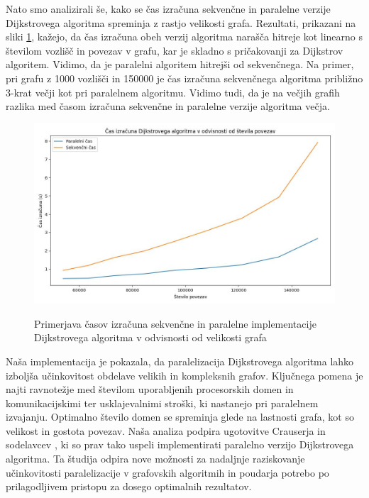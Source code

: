 \documentclass[mat1, tisk]{fmfdelo}
\begin{document}
Nato smo analizirali še, kako se čas izračuna sekvenčne in paralelne verzije Dijkstrovega algoritma spreminja z rastjo
velikosti grafa. Rezultati, prikazani na sliki \ref{fig:dijkstra_calculation_time_by_graph_size}, kažejo, da čas izračuna
obeh verzij algoritma narašča hitreje kot linearno s številom vozlišč in povezav v grafu, kar je skladno s pričakovanji
za Dijkstrov algoritem. Vidimo, da je paralelni algoritem hitrejši od sekvenčnega. Na primer, pri grafu z 1000 vozlišči
in 150000 je čas izračuna sekvenčnega algoritma približno 3-krat večji kot pri paralelnem algoritmu. Vidimo tudi, da je
na večjih grafih razlika med časom izračuna sekvenčne in paralelne verzije algoritma večja.  

\begin{figure}[h!]
  \centering
  \caption{Primerjava časov izračuna sekvenčne in paralelne implementacije Dijkstrovega algoritma v odvisnosti od velikosti grafa}
  \includegraphics[width=15cm]{slike/dijkstra_v_odvisnosti_od_velikosti_grafa.jpg}
  \label{fig:dijkstra_calculation_time_by_graph_size}
\end{figure}

Naša implementacija je pokazala, da paralelizacija Dijkstrovega algoritma lahko izboljša učinkovitost obdelave velikih
in kompleksnih grafov. Ključnega pomena je najti ravnotežje med številom uporabljenih procesorskih domen in
komunikacijskimi ter usklajevalnimi stroški, ki nastanejo pri paralelnem izvajanju. Optimalno število domen se spreminja
glede na lastnosti grafa, kot so velikost in gostota povezav. Naša analiza podpira ugotovitve Crauserja in
sodelavcev \cite{crauser1998parallelizing}, ki so prav tako uspeli implementirati paralelno verzijo Dijkstrovega algoritma.
Ta študija odpira nove možnosti za nadaljnje raziskovanje učinkovitosti paralelizacije v grafovskih algoritmih in
poudarja potrebo po prilagodljivem pristopu za dosego optimalnih rezultatov.
\end{document}
